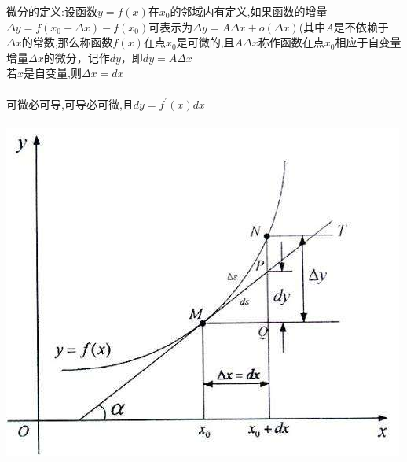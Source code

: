 \documentclass{article}
\begin{document}
\begin{flushleft}
	微分的定义:设函数$y=f(x)$在$x_0$的邻域内有定义,如果函数的增量$\Delta y = f(x_0 + \Delta x) − f(x_0)$可表示为$ \Delta y = A\Delta x + o(\Delta x)$(其中$A$是不依赖于$\Delta x$的常数,那么称函数$f(x)$在点$x_0$是可微的,且$A\Delta x$称作函数在点$x_0$相应于自变量增量$\Delta x$的微分，记作$dy$，即$dy = A\Delta x$\\
	若$x$是自变量,则$\Delta x=dx$\\
	~\\
	可微必可导,可导必可微,且$dy=f^{'}(x)dx$\\
	~\\
	\includegraphics[scale=1.0]{1.jpg}
	
\end{flushleft}
\end{document}
